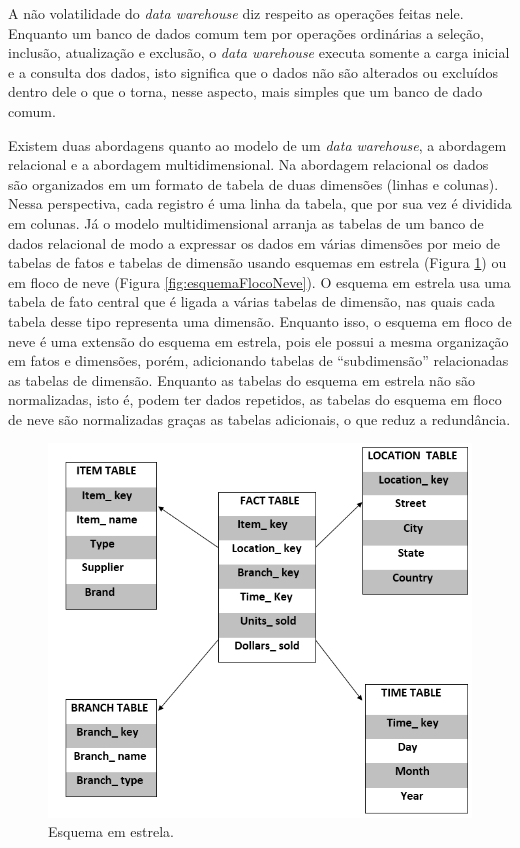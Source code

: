 A não volatilidade do \textit{data warehouse} diz respeito as operações feitas nele. Enquanto um banco de dados comum tem por operações ordinárias a seleção, inclusão, atualização e exclusão, o \textit{data warehouse} executa somente a carga inicial e a consulta dos dados, isto significa que o dados não são alterados ou excluídos dentro dele o que o torna, nesse aspecto, mais simples que um banco de dado comum.

Existem duas abordagens quanto ao modelo de um \textit{data warehouse}, a abordagem relacional e a abordagem multidimensional. Na abordagem relacional os dados são organizados em um formato de tabela de duas dimensões (linhas e colunas). Nessa perspectiva, cada registro é uma linha da tabela, que por sua vez é dividida em colunas. Já o modelo multidimensional arranja as tabelas de um banco de dados relacional de modo a expressar os dados em várias dimensões por meio de tabelas de fatos e tabelas de dimensão usando esquemas em estrela (Figura \ref{fig:esquemaEstrela}) ou em floco de neve (Figura \ref{fig:esquemaFlocoNeve}). O esquema em estrela usa uma tabela de fato central que é ligada a várias tabelas de dimensão, nas quais cada tabela desse tipo representa uma dimensão. Enquanto isso, o esquema em floco de neve é uma extensão do esquema em estrela, pois ele possui a mesma organização em fatos e dimensões, porém, adicionando tabelas de \enquote{subdimensão} relacionadas as tabelas de dimensão. Enquanto as tabelas do esquema em estrela não são normalizadas, isto é, podem ter dados repetidos, as tabelas do esquema em floco de neve são normalizadas graças as tabelas adicionais, o que reduz a redundância.

\begin{figure}[ht]
\centering
\includegraphics[width=.8\textwidth]{imagens/example-star-schema.png}
\caption{Esquema em estrela.}
\author{Fonte: https://www.educba.com/star-schema-vs-snowflake-schema/}
\label{fig:esquemaEstrela}
\end{figure}

